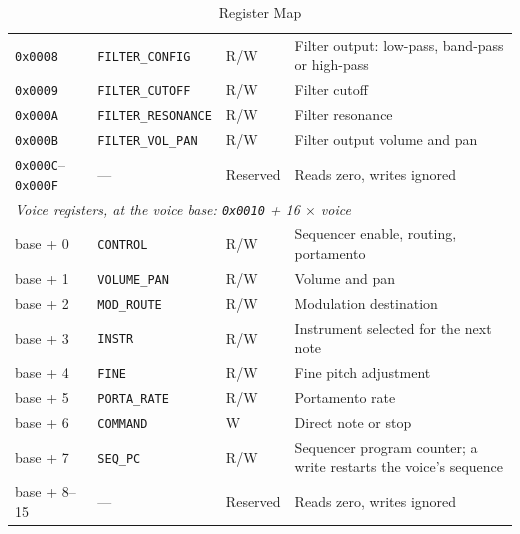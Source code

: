 \begin{table}[H]
\begin{tabular}{lllp{6.2cm}}
		\texttt{0x0008}                  & \texttt{FILTER\_CONFIG}    & R/W             & Filter output: low-pass, band-pass or high-pass                  \\
		\texttt{0x0009}                  & \texttt{FILTER\_CUTOFF}    & R/W             & Filter cutoff                                                    \\
		\texttt{0x000A}                  & \texttt{FILTER\_RESONANCE} & R/W             & Filter resonance                                                 \\
		\texttt{0x000B}                  & \texttt{FILTER\_VOL\_PAN}  & R/W             & Filter output volume and pan                                     \\
		\texttt{0x000C}--\texttt{0x000F} & ---                        & Reserved        & Reads zero, writes ignored                                       \\
		\midrule
		\multicolumn{4}{l}{\textit{Voice registers, at the voice base: \texttt{0x0010} + 16 $\times$ voice}}                                               \\
		\midrule
		base + 0                         & \texttt{CONTROL}           & R/W             & Sequencer enable, routing, portamento                            \\
		base + 1                         & \texttt{VOLUME\_PAN}       & R/W             & Volume and pan                                                   \\
		base + 2                         & \texttt{MOD\_ROUTE}        & R/W             & Modulation destination                                           \\
		base + 3                         & \texttt{INSTR}             & R/W             & Instrument selected for the next note                            \\
		base + 4                         & \texttt{FINE}              & R/W             & Fine pitch adjustment                                            \\
		base + 5                         & \texttt{PORTA\_RATE}       & R/W             & Portamento rate                                                  \\
		base + 6                         & \texttt{COMMAND}           & W               & Direct note or stop                                              \\
		base + 7                         & \texttt{SEQ\_PC}           & R/W             & Sequencer program counter; a write restarts the voice's sequence \\
		base + 8--15                     & ---                        & Reserved        & Reads zero, writes ignored                                       \\
		\bottomrule
	\end{tabular}
	\caption{Register Map}
	\label{tab:register-map}
\end{table}

